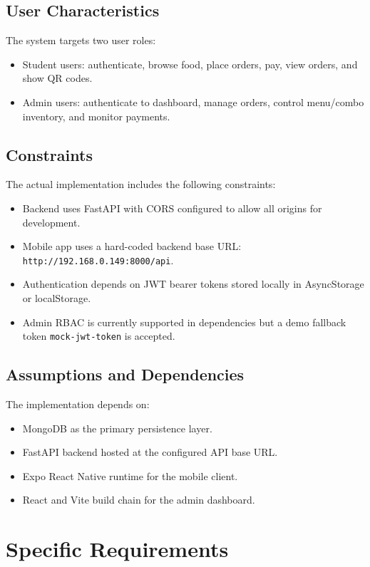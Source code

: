 \documentclass[11pt]{article}
\begin{document}
\subsection{User Characteristics}
The system targets two user roles:
\begin{itemize}[nosep]
  \item Student users: authenticate, browse food, place orders, pay, view orders, and show QR codes.
  \item Admin users: authenticate to dashboard, manage orders, control menu/combo inventory, and monitor payments.
\end{itemize}

\subsection{Constraints}
The actual implementation includes the following constraints:
\begin{itemize}[nosep]
  \item Backend uses FastAPI with CORS configured to allow all origins for development.
  \item Mobile app uses a hard-coded backend base URL: \texttt{http://192.168.0.149:8000/api}.
  \item Authentication depends on JWT bearer tokens stored locally in AsyncStorage or localStorage.
  \item Admin RBAC is currently supported in dependencies but a demo fallback token \texttt{mock-jwt-token} is accepted.
\end{itemize}

\subsection{Assumptions and Dependencies}
The implementation depends on:
\begin{itemize}[nosep]
  \item MongoDB as the primary persistence layer.
  \item FastAPI backend hosted at the configured API base URL.
  \item Expo React Native runtime for the mobile client.
  \item React and Vite build chain for the admin dashboard.
\end{itemize}

\section{Specific Requirements}
\end{document}
